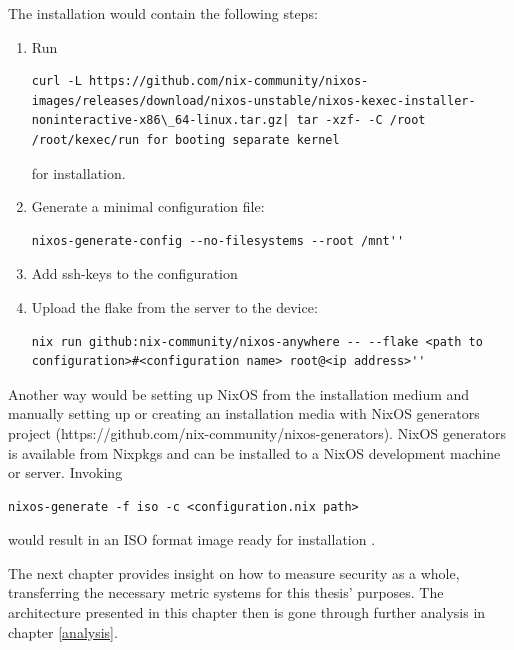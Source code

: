 The installation would contain the following steps:
\begin{enumerate}
\item Run
\begin{lstlisting}
curl -L https://github.com/nix-community/nixos-images/releases/download/nixos-unstable/nixos-kexec-installer-noninteractive-x86\_64-linux.tar.gz| tar -xzf- -C /root /root/kexec/run for booting separate kernel
\end{lstlisting}
for installation.
\item Generate a minimal configuration file:
\begin{lstlisting}
nixos-generate-config --no-filesystems --root /mnt''
\end{lstlisting}
\item Add ssh-keys to the configuration
\item Upload the flake from the server to the device:
\begin{lstlisting}
nix run github:nix-community/nixos-anywhere -- --flake <path to configuration>#<configuration name> root@<ip address>''
\end{lstlisting}
\end{enumerate}
Another way would be setting up NixOS from the installation medium and
manually setting up or creating an installation media with NixOS
generators project
(https://github.com/nix-community/nixos-generators). NixOS generators
is available from Nixpkgs and can be installed to a NixOS
development machine or server. Invoking
\begin{lstlisting}
nixos-generate -f iso -c <configuration.nix path>
\end{lstlisting}
would result in an ISO format image ready for
installation \cite{githubGitHubNixcommunitynixosanywhere}.

The next chapter provides insight on how to measure security as a
whole, transferring the necessary metric systems for this thesis'
purposes. The architecture presented in this chapter then is gone
through further analysis in chapter \ref{analysis}.
